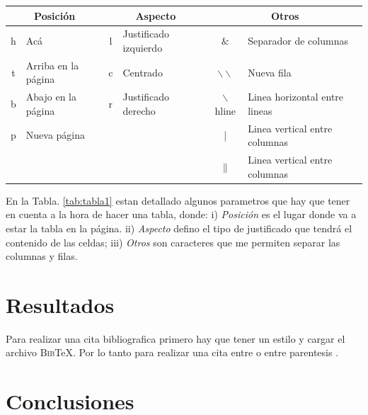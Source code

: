 \documentclass[a4paper,11pt,twoside]{article}
\begin{document}
\begin{table}[h] %
 \centering
 {\small %
 \begin{tabular}{||c|l|c|l|c|l||} %
  \hline
  \multicolumn{2}{||c|}{Posición} & \multicolumn{2}{c|}{Aspecto} & \multicolumn{2}{c||}{Otros} \\ \hline
  h    & Acá 		                 & l & Justificado izquierdo & $\&$                    & Separador de columnas \\ \hline
  t    & Arriba en la página             & c & Centrado              & $\backslash \backslash$ &  Nueva fila \\ \hline
  b    & Abajo en la página              & r & Justificado derecho   & $\backslash$hline       & Linea horizontal entre lineas \\ \hline
  p    & Nueva página        		 &   &                       & |                       & Linea vertical entre columnas \\ \hline
       &                                 &   &                       & $\|$                    & Linea vertical entre columnas \\ \hline
 \end{tabular}
 }
 \label{tab:tabla2}
\end{table}

En la Tabla. \ref{tab:tabla1} estan detallado algunos parametros que hay que tener en cuenta a la hora de hacer una tabla, donde: i) \textit{Posición} es el lugar donde va a estar la tabla en la página. ii) \textit{Aspecto} defino el tipo de justificado que tendrá el contenido de las celdas; iii) \textit{Otros} son caracteres que me permiten separar las columnas y filas.

\section{Resultados}
Para realizar una cita bibliografica primero hay que tener un estilo y cargar el archivo \textsc{Bib}\TeX{}. Por lo tanto para realizar una cita entre \citet{Blakely1996} o entre parentesis \citep{Blakely1996}.

\section{Conclusiones}


\newpage %

\tableofcontents{}

\newpage

\end{document}
